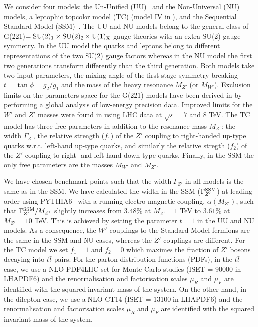 We consider four models: the Un-Unified (UU)~\cite{Georgi:1989ic,Georgi:1989xz} and the Non-Universal (NU)~\cite{Malkawi:1996fs,Li:1981nk}
models, a leptophic topcolor model (TC) (model IV in ), and the Sequential Standard Model (SSM)~\cite{Altarelli:1989ff}.
The UU and NU models belong to the general class of G(221)$={\rm SU}(2)_1 \times \rm{SU}(2)_2 \times U(1)_X$ gauge theories 
with an extra SU(2) gauge symmetry.
In the UU model the quarks and leptons  belong to different representations of the two SU(2) gauge factors whereas in the NU model
the first two generations transform differently than the third generation. Both models take two input parameters, the mixing angle 
of the first stage symmetry breaking  $t=\tan \phi = g_2/g_1$ and the mass of the heavy resonance $M_{Z'}$ (or $M_{W'}$).
Exclusion limits on the parameters space for the G(221) models have been derived in  by performing 
a global analysis of low-energy precision data. Improved limits for the $W'$ and $Z'$ masses were found in  using LHC 
data at $\sqrt{s}=7$ and 8 TeV.
The TC model has three free parameters in addition to the resonance mass $M_{Z'}$: 
the width $\Gamma_{Z'}$, the relative strength ($f_1$) of the $Z'$ coupling 
to right-handed up-type quarks w.r.t. left-hand up-type quarks, and similarly the relative stregth ($f_2$) of the $Z'$ coupling to right- and left-hand down-type quarks. 
Finally, in the SSM the only free parameters are the masses $M_{W'}$ and $M_{Z'}$.

We have chosen benchmark points such that the width $\Gamma_{Z'}$ in all models is the same as in the SSM.
We have calculated the width in the SSM ($\Gamma_{Z'}^{\rm SSM}$) at leading order using PYTHIA6~\cite{Sjostrand:2014zea} with a running 
electro-magnetic coupling, $\alpha(M_{Z'})$, such that $\Gamma_{Z'}^{\rm SSM}/M_{Z'}$ slightly increases from $3.48\%$ at $M_{Z'} =1$ TeV
to $3.61\%$ at $M_{Z'} =10$ TeV.
This is achieved by setting the parameter $t=1$ in the UU and NU models. As a consequence, the $W'$ couplings to the Standard Model fermions
are the same in the SSM and NU cases, whereas the $Z'$ couplings are different.
For the TC model we set  $f_1 = 1$ and  $f_2=0$ which maximes the fraction of $Z'$ bosons decaying into $t \bar t$ pairs.
For the parton distribution functions (PDFs), in the $t \bar t$ case, we use a NLO PDF4LHC set for Monte Carlo studies (ISET = 90000 in LHAPDF6)  and the renormalisation and factorisation scales $\mu_R$ and $\mu_F$ are identified with the squared invariant mass of the system.
On the other hand, in the dilepton case, we use a NLO CT14 (ISET = 13100 in LHAPDF6) and the renormalisation and factorisation scales $\mu_R$ and $\mu_F$ are identified with the squared invariant mass of the system. 

